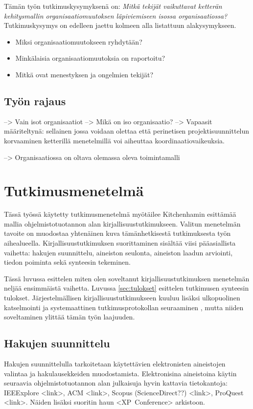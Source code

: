 Tämän työn tutkimuskysymyksenä on: \textit{Mitkä tekijät vaikuttavat ketterän
kehitysmallin organisaatiomuutoksen läpiviemiseen isossa organisaatiossa?}
Tutkimuskysymys on edelleen jaettu kolmeen alla listattuun alakysymykseen.

\begin{itemize}
\item Miksi organisaatiomuutokseen ryhdytään?
\item Minkälaisia organisaatiomuutoksia on raportoitu?
\item Mitkä ovat menestyksen ja ongelmien tekijät?
\end{itemize}

\subsection{Työn rajaus}

--> Vain isot organisaatiot
--> Mikä on iso organisaatio? --> Vapaasit määriteltynä: sellainen jossa voidaan
olettaa että perinetisen projektisuunnittelun korvaaminen ketterillä
menetelmillä voi aiheuttaa koordinaatiovaikeuksia.

--> Organisaatiossa on oltava olemassa oleva toimintamalli


\section{Tutkimusmenetelmä}
\label{sec:menetelma}

Tässä työssä käytetty tutkimusmenetelmä myötäilee Kitchenhamin esittämää mallia
ohjelmistotuotannon alan kirjallisuustutkimukseen. Valitun menetelmän tavoite on
muodostaa yhtenäinen kuva tämänhetkisestä tutkimuksesta työn aihealueella.
Kirjallisuustutkimuksen suorittaminen sisältää viisi pääasiallista vaihetta:
hakujen suunnittelu, aineiston seulonta, aineiston laadun arviointi, tiedon
poiminta sekä synteesin tekeminen. \citep{Kitchenham2007}

Tässä luvussa esittelen miten olen soveltanut kirjallisuustutkimuksen menetelmän
neljää ensimmäistä vaihetta. Luvussa \ref{sec:tulokset} esittelen tutkimusen
synteesin tulokset. Järjestelmällisen kirjallisuustutkimukseen kuuluu lisäksi
ulkopuolinen katselmointi ja systemaattinen tutkimusprotokollan seuraaminen
\citep{Kitchenham2007}, mutta niiden soveltaminen ylittää tämän työn laajuuden.

\subsection{Hakujen suunnittelu}
Hakujen suunnittelulla tarkoitetaan käytettävien elektronisten aineistojen
valintaa ja hakulausekkeiden muodostamista. Elektronisina aineistoina käytin
seuraavia ohjelmistotuotannon alan julkaisuja hyvin kattavia tietokantoja:
IEEExplore <link>, ACM <link>, Scopus (ScienceDirect??) <link>, ProQuest <link>.
Näiden lisäksi suoritin haun <XP~Conference> arkistoon.

